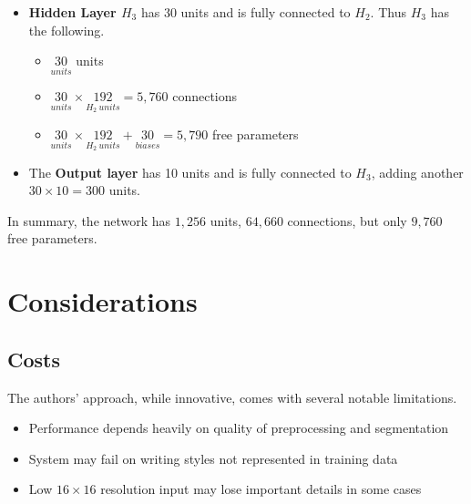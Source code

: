 \documentclass[10pt]{article}
\begin{document}
\begin{itemize}
    \item \textbf{Hidden Layer \(H_3\)} has 30 units and is fully connected to \(H_2\). Thus \(H_3\) has the following.

          \begin{itemize}
              \item \(\underset{units}{30}\) units
              \item \(\underset{units}{30} \times \underset{H_{2}~units}{192} = 5,760\) connections
              \item \(\underset{units}{30} \times \underset{H_{2}~units}{192} + \underset{biases}{30} = 5,790\) free parameters
          \end{itemize}

    \item The \textbf{Output layer} has 10 units and is fully connected to \(H_3\), adding another \(30 \times 10 = 300\) units.
\end{itemize}

In summary, the network has \(1,256\) units, \(64,660\) connections, but only \(9,760\) free parameters.


\section*{Considerations}

\subsection*{Costs}


The authors' approach, while innovative, comes with several notable limitations.

\begin{itemize}
    \item Performance depends heavily on quality of preprocessing and segmentation
    \item System may fail on writing styles not represented in training data
    \item Low \(16 \times 16\) resolution input may lose important details in some cases
\end{itemize}
\end{document}
